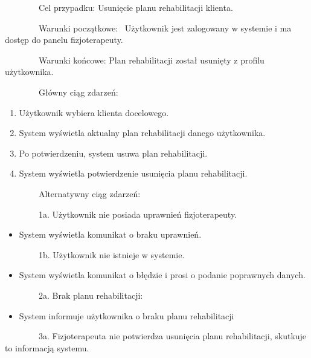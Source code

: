 \documentclass[
]{article}
\providecommand{\tightlist}{%
  \setlength{\itemsep}{0pt}\setlength{\parskip}{0pt}}
\begin{document}
{~~~~~~~~Cel przypadku: Usunięcie planu rehabilitacji klienta.}

{~~~~~~~~Warunki początkowe: ~Użytkownik jest zalogowany w systemie i ma
dostęp do panelu fizjoterapeuty.}

{~~~~~~~~Warunki końcowe: Plan rehabilitacji został usunięty z profilu
użytkownika.}

{~~~~~~~~Główny ciąg zdarzeń:}

\begin{enumerate}
\tightlist
\item
  {Użytkownik wybiera klienta docelowego.}
\item
  {System wyświetla aktualny plan rehabilitacji danego użytkownika.}
\item
  {Po potwierdzeniu, system usuwa plan rehabilitacji.}
\item
  {System wyświetla potwierdzenie usunięcia planu rehabilitacji.}
\end{enumerate}

{~~~~~~~~Alternatywny ciąg zdarzeń:}

{~~~~~~~~1a. Użytkownik nie posiada uprawnień fizjoterapeuty.}

\begin{itemize}
\tightlist
\item
  {System wyświetla komunikat o braku uprawnień.}
\end{itemize}

{~~~~~~~~1b. Użytkownik nie istnieje w systemie.}

\begin{itemize}
\tightlist
\item
  {System wyświetla komunikat o błędzie i prosi o podanie poprawnych
  danych.}
\end{itemize}

{~~~~~~~~2a. Brak planu rehabilitacji:}

\begin{itemize}
\tightlist
\item
  {System informuje użytkownika o braku planu rehabilitacji}
\end{itemize}

{~~~~~~~~3a. Fizjoterapeuta nie potwierdza usunięcia planu
rehabilitacji, skutkuje to informacją systemu.}

\hypertarget{h.t2karqe3ncvt}{%
\subsection{\texorpdfstring{{~~~~~~~~}}{~~~~~~~~}}\label{h.t2karqe3ncvt}}
\end{document}
